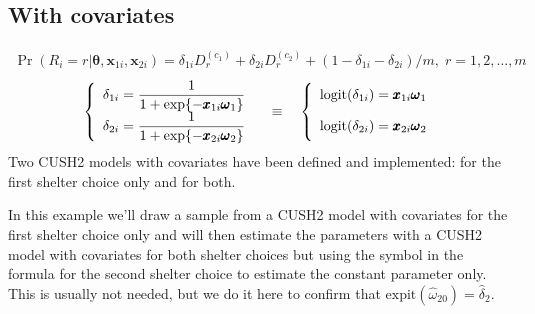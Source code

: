 \documentclass[letterpaper,10pt,english]{sphinxmanual}
\begin{document}
\subsection{With covariates}
\label{\detokenize{manual:cush2-with-covariates}}\label{\detokenize{manual:id28}}
\sphinxAtStartPar
{}

\sphinxAtStartPar
{}
\begin{equation*}
\begin{split}\Pr(R_i=r|\pmb\theta,\pmb x_{1i}, \pmb x_{2i}) = \delta_{1i} D_r^{(c_1)} + \delta_{2i} D_r^{(c_2)} + (1-\delta_{1i}- \delta_{2i})/m
,\; r=1,2,\ldots,m\end{split}
\end{equation*}\begin{equation*}
\begin{split}\left\{
\begin{array}{l}
    \delta_{1i} = \dfrac{1}{1+\exp\{ - \pmb x_{1i} \pmb\omega_1 \}}
    \\
    \delta_{2i} = \dfrac{1}{1+\exp\{ - \pmb x_{2i} \pmb\omega_2 \}}
\end{array}
\right.
\quad \equiv \quad
\left\{
\begin{array}{l}
    \mathrm{logit}(\delta_{1i}) = \pmb x_{1i} \pmb\omega_1
    \vphantom{\dfrac{1}{1+\exp\{ - \pmb x_{1i} \pmb\omega_1 \}}}
    \\
    \mathrm{logit}(\delta_{2i}) = \pmb x_{2i} \pmb\omega_2
    \vphantom{\dfrac{1}{1+\exp\{ - \pmb x_{2i} \pmb\omega_2 \}}}
\end{array}
\right.\end{split}
\end{equation*}
\sphinxAtStartPar
Two CUSH2 models with covariates have been defined and implemented:
for the first shelter choice only and for both.

\sphinxAtStartPar
In this example we’ll draw a sample from a CUSH2 model with
covariates for the first shelter choice only and will then
estimate the parameters with a CUSH2 model with covariates
for both shelter choices but using the symbol  in the
formula for the second shelter choice to estimate the
constant parameter only. This is usually not needed, but
we do it here to confirm that \(\mathrm{expit}(\hat\omega_{20})=\hat\delta_2\).
\end{document}
